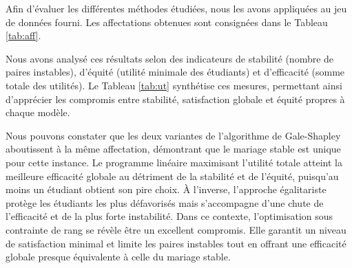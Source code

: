 \documentclass{article}
\begin{document}
Afin d'évaluer les différentes méthodes étudiées, nous les avons appliquées au jeu de données fourni. 
Les affectations obtenues sont consignées dans le Tableau \ref{tab:aff}.

Nous avons analysé ces résultats selon des indicateurs de stabilité (nombre de paires instables),
d'équité (utilité minimale des étudiants) et d'efficacité (somme totale des utilités). 
Le Tableau \ref{tab:ut} synthétise ces mesures, permettant ainsi d'apprécier les compromis entre stabilité, 
satisfaction globale et équité propres à chaque modèle.

Nous pouvons constater que les deux variantes de l'algorithme de Gale-Shapley aboutissent à la même affectation, 
démontrant que le mariage stable est unique pour cette instance. Le programme linéaire maximisant l'utilité totale 
atteint la meilleure efficacité globale au détriment de la stabilité et de l'équité, puisqu'au moins un étudiant 
obtient son pire choix. À l'inverse, l'approche égalitariste protège les étudiants les plus défavorisés mais 
s'accompagne d'une chute de l'efficacité et de la plus forte instabilité. Dans ce contexte, l'optimisation sous 
contrainte de rang se révèle être un excellent compromis. Elle garantit un niveau de satisfaction minimal et limite 
les paires instables tout en offrant une efficacité globale presque équivalente à celle du mariage stable.



\end{document}
